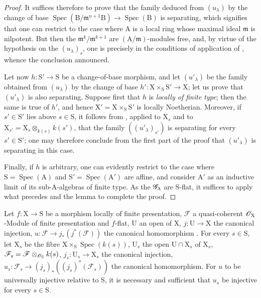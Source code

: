\begin{proof}
It suffices therefore to prove that the family deduced from $(u_\lambda)$ by the change of base $\operatorname{Spec}(\mathrm{B}/\mathfrak{m}^{n+1}\mathrm{B})\to\operatorname{Spec}(\mathrm{B})$ is separating, which signifies that one can restrict to the case where $\mathrm{A}$ is a local ring whose maximal ideal $\mathfrak{m}$ is nilpotent.
But then the $\mathfrak{m}^k/\mathfrak{m}^{k+1}$ are $(\mathrm{A}/\mathfrak{m})$-modules free, and, by virtue of the hypothesis on the $(u_\lambda)_s$, one is precisely in the conditions of application of , whence the conclusion announced.

Let now $h:\mathrm{S}'\to\mathrm{S}$ be a change-of-base morphism, and let $(u'_\lambda)$ be the family obtained from $(u_\lambda)$ by the change of base $h':\mathrm{X}\times_\mathrm{S}\mathrm{S}'\to\mathrm{X}$; let us prove that $(u'_\lambda)$ is also separating.
Suppose first that $h$ is \emph{locally of finite type}; then the same is true of $h'$, and hence $\mathrm{X}'=\mathrm{X}\times_\mathrm{S}\mathrm{S}'$ is locally Noetherian. Moreover, if $s'\in\mathrm{S}'$ lies above $s\in\mathrm{S}$, it follows from , applied to $\mathrm{X}_s$ and to $\mathrm{X}_{s'}=\mathrm{X}_s\otimes_{k(s)}k(s')$, that the family $((u'_\lambda)_{s'})$ is separating for every $s'\in\mathrm{S}'$; one may therefore conclude from the first part of the proof that $(u'_\lambda)$ is separating in this case.

Finally, if $h$ is arbitrary, one can evidently restrict to the case where $\mathrm{S}=\operatorname{Spec}(\mathrm{A})$ and $\mathrm{S}'=\operatorname{Spec}(\mathrm{A}')$ are affine, and consider $\mathrm{A}'$ as an inductive limit of its sub-$\mathrm{A}$-algebras of finite type.
As the $\mathscr{G}_\lambda$ are $\mathrm{S}$-flat, it suffices to apply what precedes and the lemma  to complete the proof.
\end{proof}

\begin{proposition}[11.9.17]
\label{IV.11.9.17}
Let $f:\mathrm{X}\to\mathrm{S}$ be a morphism locally of finite presentation, $\mathscr{F}$ a quasi-coherent $\mathscr{O}_\mathrm{X}$-Module of finite presentation and $f$-flat, $\mathrm{U}$ an open of $\mathrm{X}$, $j:\mathrm{U}\to\mathrm{X}$ the canonical injection, $u:\mathscr{F}\to j_*(j^*(\mathscr{F}))$ the canonical homomorphism .
For every $s\in\mathrm{S}$, let $\mathrm{X}_s$ be the fibre $\mathrm{X}\times_\mathrm{S}\operatorname{Spec}(k(s))$, $\mathrm{U}_s$ the open $\mathrm{U}\cap\mathrm{X}_s$ of $\mathrm{X}_s$, $\mathscr{F}_s=\mathscr{F}\otimes_{\mathscr{O}_\mathrm{S}}k(s)$, $j_s:\mathrm{U}_s\to\mathrm{X}_s$ the canonical injection, $u_s:\mathscr{F}_s\to(j_s)_*((j_s)^*(\mathscr{F}_s))$ the canonical homomorphism.
For $u$ to be universally injective relative to $\mathrm{S}$, it is necessary and sufficient that $u_s$ be injective for every $s\in\mathrm{S}$.
\end{proposition}

